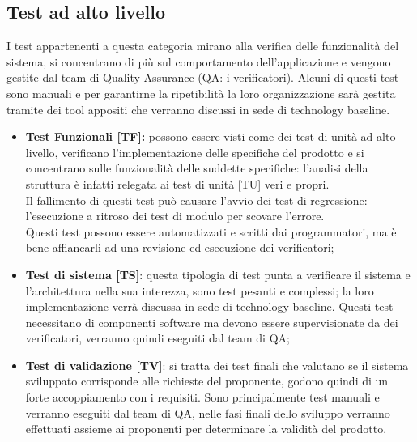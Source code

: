 \documentclass[PianoDiProgetto.tex]{subfiles}
\begin{document}
\subsection{Test ad alto livello}
I test appartenenti a questa categoria mirano alla verifica delle funzionalità del sistema, si concentrano di più sul comportamento dell'applicazione e vengono gestite dal team di Quality Assurance (QA: i verificatori).
Alcuni di questi test sono manuali e per garantirne la ripetibilità la loro organizzazione sarà gestita tramite dei tool appositi che verranno discussi in sede di technology baseline.
\begin{itemize}
	\item \textbf{Test Funzionali [TF]:} possono essere visti come dei test di unità ad alto livello, verificano l'implementazione delle specifiche del prodotto e si concentrano sulle funzionalità delle suddette specifiche: l'analisi della struttura è infatti relegata ai test di unità [TU] veri e propri. \\
	Il fallimento di questi test può causare l'avvio dei test di regressione: l'esecuzione a ritroso dei test di modulo per scovare l'errore.\\ %
	Questi test possono essere automatizzati e scritti dai programmatori, ma è bene affiancarli ad una revisione ed esecuzione dei verificatori;
	\item \textbf{Test di sistema [TS]}: questa tipologia di test punta a verificare il sistema e l'architettura nella sua interezza, sono test pesanti e complessi; la loro implementazione verrà discussa in sede di technology baseline. 
	Questi test necessitano di componenti software ma devono essere supervisionate da dei verificatori, verranno quindi eseguiti dal team di QA;
	\item \textbf{Test di validazione [TV]}: si tratta dei test finali che valutano se il sistema sviluppato corrisponde alle richieste del proponente, godono quindi di un forte accoppiamento con i requisiti. Sono principalmente test manuali e verranno eseguiti dal team di QA, nelle fasi finali dello sviluppo verranno effettuati assieme ai proponenti per determinare la validità del prodotto.

\end{itemize}	
	
\end{document}
